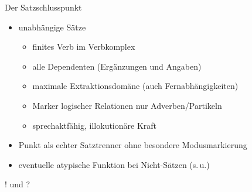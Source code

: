 \begin{frame}
  {Der Satzschlusspunkt}
  \onslide<+->
  \begin{itemize}[<+->]
    \item unabhängige Sätze
      \begin{itemize}[<+->]
        \item finites Verb im Verbkomplex
        \item alle Dependenten (Ergänzungen und Angaben)
        \item maximale Extraktionsdomäne (auch Fernabhängigkeiten)
        \item Marker logischer Relationen nur Adverben\slash Partikeln
        \item sprechaktfähig, illokutionäre Kraft
      \end{itemize}
      \Zeile
    \item Punkt als \alert{echter Satztrenner ohne besondere Modusmarkierung}
    \item eventuelle atypische Funktion bei Nicht-Sätzen (s.\,u.)
  \end{itemize}
\end{frame}

\begin{frame}
  {! und ?}
  \onslide<+->
  \onslide<+->
  \begin{exe}
    \ex 
    \begin{xlist}
    \end{xlist}
    \ex 
    \begin{xlist}
    \end{xlist}
  \end{exe}
\end{frame}


